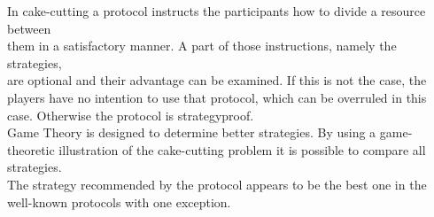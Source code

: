 In cake-cutting a protocol instructs the participants how to divide a resource between\\them in a satisfactory manner. A part of those instructions, namely the strategies,\\are optional and their advantage can be examined. If this is not the case, the players have no intention to use that protocol, which can be overruled in this case. Otherwise the protocol is strategyproof.\\Game Theory is designed to determine better strategies. By using a game-theoretic illustration of the cake-cutting problem it is possible to compare all strategies.\\The strategy recommended by the protocol appears to be the best one in the well-known protocols with one exception.  



